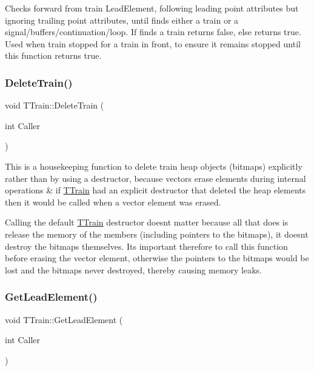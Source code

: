 Checks forward from train Lead\+Element, following leading point attributes but ignoring trailing point attributes, until finds either a train or a signal/buffers/continuation/loop. If finds a train returns false, else returns true. Used when train stopped for a train in front, to ensure it remains stopped until this function returns true. \mbox{\label{class_t_train_afd5d7ea375b8a878c31d81841acad159}} 
\subsubsection{\texorpdfstring{Delete\+Train()}{DeleteTrain()}}
{\footnotesize\ttfamily void T\+Train\+::\+Delete\+Train (\begin{DoxyParamCaption}\item[{int}]{Caller }\end{DoxyParamCaption})\hspace{0.3cm}{\ttfamily [private]}}

This is a housekeeping function to delete train heap objects (bitmaps) explicitly rather than by using a destructor, because vectors erase elements during internal operations \& if \mbox{\hyperlink{class_t_train}{T\+Train}} had an explicit destructor that deleted the heap elements then it would be called when a vector element was erased.

Calling the default \mbox{\hyperlink{class_t_train}{T\+Train}} destructor doesn\textquotesingle{}t matter because all that does is release the memory of the members (including pointers to the bitmaps), it doesn\textquotesingle{}t destroy the bitmaps themselves. It\textquotesingle{}s important therefore to call this function before erasing the vector element, otherwise the pointers to the bitmaps would be lost and the bitmaps never destroyed, thereby causing memory leaks. \mbox{\label{class_t_train_a0675ea1dede706d5b0dd52264496865a}} 
\subsubsection{\texorpdfstring{Get\+Lead\+Element()}{GetLeadElement()}}
{\footnotesize\ttfamily void T\+Train\+::\+Get\+Lead\+Element (\begin{DoxyParamCaption}\item[{int}]{Caller }\end{DoxyParamCaption})\hspace{0.3cm}{\ttfamily [private]}}


